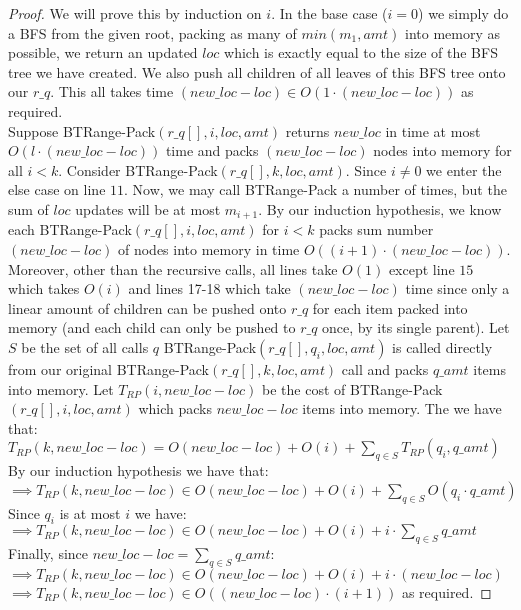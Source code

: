 \documentclass[letterpaper,12pt,titlepage,oneside,final]{book}
\theoremstyle{plain}
\begin{document}
\begin{proof}
We will prove this by induction on $i$. In the base case ($i=0$) we simply do a BFS from the given root, packing as many of $min(m_1, amt)$ into memory as possible, we return an updated $loc$ which is exactly equal to the size of the BFS tree we have created. We also push all children of all leaves of this BFS tree onto our $r\_q$. This all takes time $(new\_loc - loc) \in O(1\cdot (new\_loc - loc))$ as required. \\

Suppose BT\textendash Range-Pack$(r\_q[], i, loc, amt)$ returns $new\_loc$ in time at most $O(l\cdot (new\_loc - loc))$ time and packs $(new\_loc - loc)$ nodes into memory for all $i < k$. Consider BT\textendash Range-Pack$(r\_q[], k, loc, amt)$. Since $i \neq 0$ we enter the else case on line $11$. Now, we may call BT\textendash Range-Pack a number of times, but the sum of $loc$ updates will be at most $m_{i+1}$. By our induction hypothesis, we know each BT\textendash Range-Pack$(r\_q[], i, loc, amt)$ for $i < k$ packs sum number $(new\_loc - loc)$ of nodes into memory in time $O((i+1)\cdot (new\_loc - loc))$. Moreover, other than the recursive calls, all lines take $O(1)$ except line $15$ which takes $O(i)$ and lines 17-18 which take $(new\_loc - loc)$ time since only a linear amount of children can be pushed onto $r\_q$ for each item packed into memory (and each child can only be pushed to $r\_q$ once, by its single parent). Let $S$ be the set of all calls $q$ BT\textendash Range-Pack$(r\_q[], q_i, loc, amt)$ is called directly from our original BT\textendash Range-Pack$(r\_q[], k, loc, amt)$ call and packs $q\_amt$ items into memory. Let $T_{RP}(i, new\_loc - loc)$ be the cost of BT\textendash Range-Pack$(r\_q[], i, loc, amt)$ which packs $new\_loc - loc$ items into memory. The we have that: \\

$T_{RP}(k, new\_loc - loc) = O(new\_loc - loc) + O(i) + \sum_{q \in S} T_{RP}(q_i, q\_amt)$ \\ 
By our induction hypothesis we have that: \\
$\implies T_{RP}(k, new\_loc - loc) \in O(new\_loc - loc) + O(i) + \sum_{q \in S} O(q_i\cdot q\_amt)$ \\
Since $q_i$ is at most $i$ we have: \\
$\implies T_{RP}(k, new\_loc - loc) \in O(new\_loc - loc) + O(i) + i\cdot  \sum_{q \in S} q\_amt$ \\
Finally, since $new\_loc - loc = \sum_{q \in S} q\_amt$: \\
$\implies T_{RP}(k, new\_loc - loc) \in O(new\_loc - loc) + O(i) + i\cdot (new\_loc - loc)$ \\
$\implies T_{RP}(k, new\_loc - loc) \in O((new\_loc - loc)\cdot (i+1))$ as required.
\end{proof}
\end{document}
